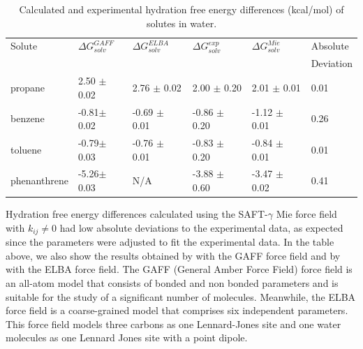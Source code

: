 \begin{table}[H]
  \centering
  \caption{Calculated and experimental hydration free energy differences  (kcal/mol) of solutes in water.}
  \label{tbl:solv2}
  \begin{tabular}{llllll}
  	\hline\hline
  	Solute       & $\Delta G_{solv}^{GAFF}$ & $\Delta G_{solv}^{ELBA}$ & $\Delta G_{solv}^{exp}$ & $\Delta G_{solv}^{Mie}$ & Absolute  \\
  	             &                          &                          &                         &                         & Deviation \\ \hline
  	propane      & 2.50 $\pm$0.02           & 2.76 $\pm$ 0.02          & 2.00 $\pm$ 0.20         & 2.01 $\pm$ 0.01         & 0.01      \\
  	benzene      & -0.81$\pm$0.02           & -0.69 $\pm$ 0.01         & -0.86 $\pm$ 0.20        & -1.12 $\pm$ 0.01        & 0.26      \\
  	toluene      & -0.79$\pm$0.03           & -0.76 $\pm$ 0.01         & -0.83 $\pm$ 0.20        & -0.84 $\pm$ 0.01        & 0.01      \\
  	phenanthrene & -5.26$\pm$0.03           & N/A                        & -3.88 $\pm$ 0.60        & -3.47 $\pm$ 0.02        & 0.41      \\ \hline\hline
  \end{tabular}

\end{table}

Hydration free energy differences calculated using the SAFT-$\gamma$ Mie force field with $k_{ij} \neq 0$ had low absolute deviations to the experimental data, as expected since the parameters were adjusted to fit the experimental data. In the table above, we also show the results obtained by  with the GAFF force field and by  with the ELBA force field. The GAFF (General Amber Force Field) force field is an all-atom model that consists of bonded and non bonded parameters and is suitable for the study of a significant number of molecules. Meanwhile, the ELBA force field is a coarse-grained model that comprises six independent parameters. This force field models three carbons as one Lennard-Jones site and one water molecules as one Lennard Jones site with a point dipole. 

